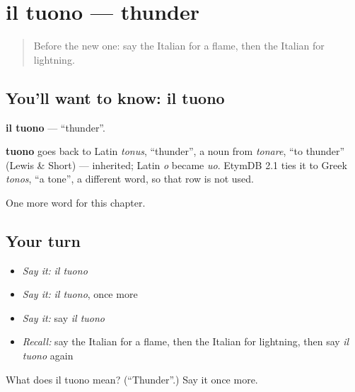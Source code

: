 \section[il tuono]{il tuono — thunder}

\label{lesson:IT-C256-tuono}



\begin{quote}
Before the new one: say the Italian for a flame, then the Italian for lightning.
\end{quote}

\subsection*{You'll want to know: il tuono}
\textbf{il tuono} — \textquotedblleft{}thunder\textquotedblright{}.

\begin{cousinweb}
\textbf{tuono} goes back to Latin \emph{tonus}, \textquotedblleft{}thunder\textquotedblright{}, a noun from \emph{tonare}, \textquotedblleft{}to thunder\textquotedblright{} (Lewis \& Short) — inherited; Latin \emph{o} became \emph{uo}. EtymDB 2.1 ties it to Greek \emph{tonos}, \textquotedblleft{}a tone\textquotedblright{}, a different word, so that row is not used.
\end{cousinweb}

\begin{grammarlens}[title={What you've built}]
One more word for this chapter.
\end{grammarlens}

\subsection*{Your turn}
\begin{itemize}
\raggedright
  \item \emph{Say it:} \emph{il tuono}
  \item \emph{Say it:} \emph{il tuono}, once more
  \item \emph{Say it:} say \emph{il tuono}
  \item \emph{Recall:} say the Italian for a flame, then the Italian for lightning, then say \emph{il tuono} again
\end{itemize}

\begin{tcolorbox}[breakable,colback=teal!4,colframe=teal!35!black,title={Before you move on}]
What does il tuono mean? (\textquotedblleft{}Thunder\textquotedblright{}.) Say it once more.
\end{tcolorbox}
